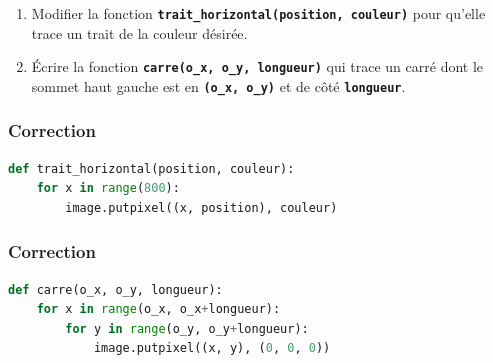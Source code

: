 \documentclass[svgnames,11pt]{beamer}
\begin{document}
\begin{frame}
    \frametitle{}

    \begin{activite}
    \begin{enumerate}
        \item Modifier la fonction \textbf{\texttt{trait\_horizontal(position, couleur)}} pour qu'elle trace un trait de la couleur désirée.
        \item Écrire la fonction \textbf{\texttt{carre(o\_x, o\_y, longueur)}} qui trace un carré dont le sommet haut gauche est en \texttt{\textbf{(o\_x, o\_y)}} et de côté \textbf{\texttt{longueur}}.
    \end{enumerate}
    \end{activite}

\end{frame}
\begin{frame}[fragile]
    \frametitle{Correction}
\begin{center}
\begin{lstlisting}[language=Python , basicstyle=\ttfamily\small, xleftmargin=2em, xrightmargin=1.5em]
def trait_horizontal(position, couleur):
    for x in range(800):
        image.putpixel((x, position), couleur)
\end{lstlisting}
\label{CODE}
\end{center}
    

\end{frame}
\begin{frame}[fragile]
    \frametitle{Correction}
\begin{center}
\begin{lstlisting}[language=Python , basicstyle=\ttfamily\small, xleftmargin=2em, xrightmargin=2em]
def carre(o_x, o_y, longueur):
    for x in range(o_x, o_x+longueur):
        for y in range(o_y, o_y+longueur):
            image.putpixel((x, y), (0, 0, 0))
\end{lstlisting}
\label{CODE}
\end{center}
    

\end{frame}
\end{document}
